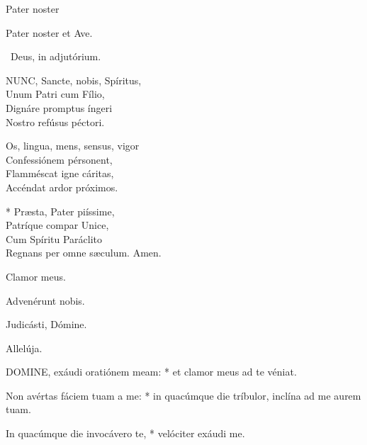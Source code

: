  Pater noster 

\sectionornament



Pater noster et Ave.

\V\ Deus, in adjutórium.


\lettrine[lines=2]{N}{UNC}, Sancte, nobis, Spíritus,\\
Unum Patri cum Fílio,\\
Dignáre promptus íngeri\\
Nostro refúsus péctori.

Os, lingua, mens, sensus, vigor\\
Confessiónem pérsonent,\\
Flamméscat igne cáritas,\\
Accéndat ardor próximos.

* Præsta, Pater piíssime,\\
Patríque compar Unice,\\
Cum Spíritu Paráclito\\
Regnans per omne sæculum. Amen.

  Clamor meus.



 Advenérunt nobis.


 Judicásti, Dómine.

  Allelúja.


\lettrine[lines=2]{D}{OMINE}, exáudi oratiónem meam: * et clamor meus ad te véniat.

Non avértas fáciem tuam a me: * in quacúmque die tríbulor, inclína ad me aurem tuam.

In quacúmque die invocávero te, * velóciter exáudi me.

